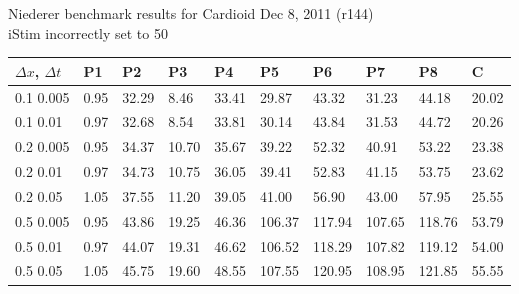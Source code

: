 \documentclass{article}
\begin{document}
\begin{center}
  {\Large  Niederer benchmark results for Cardioid Dec 8, 2011 (r144)\\
    iStim incorrectly set to 50\\[20pt]}

  \begin{tabular}{l|lllllllll}
    $\Delta x$, $\Delta t$ & P1 &P2 & P3 & P4 & P5 & P6 & P7 & P8 & C \\
    \hline
    0.1 0.005 &   0.95 &  32.29 &   8.46 &  33.41 &  29.87 &  43.32 &  31.23 &  44.18 &  20.02\\
    \hline
    0.1 0.01 &   0.97 &  32.68 &   8.54 &  33.81 &  30.14 &  43.84 &  31.53 &  44.72 &  20.26\\
    \hline
    0.2 0.005 &   0.95 &  34.37 &  10.70 &  35.67 &  39.22 &  52.32 &  40.91 &  53.22 &  23.38\\
    \hline
    0.2 0.01 &   0.97 &  34.73 &  10.75 &  36.05 &  39.41 &  52.83 &  41.15 &  53.75 &  23.62\\
    \hline
    0.2 0.05 &   1.05 &  37.55 &  11.20 &  39.05 &  41.00 &  56.90 &  43.00 &  57.95 &  25.55\\
    \hline
    0.5 0.005 &   0.95 &  43.86 &  19.25 &  46.36 & 106.37 & 117.94 & 107.65 & 118.76 &  53.79\\
    \hline
    0.5 0.01 &   0.97 &  44.07 &  19.31 &  46.62 & 106.52 & 118.29 & 107.82 & 119.12 &  54.00\\
    \hline
    0.5 0.05 &   1.05 &  45.75 &  19.60 &  48.55 & 107.55 & 120.95 & 108.95 & 121.85 &  55.55\\
    \hline
  \end{tabular}
\end{center}
\end{document}

